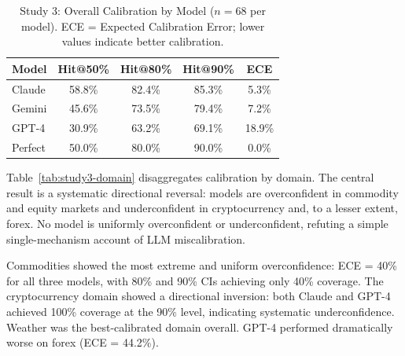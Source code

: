 \begin{table}[ht]
  \centering
  \caption{Study 3: Overall Calibration by Model ($n = 68$ per model).
    ECE = Expected Calibration Error; lower values indicate better calibration.}
  \label{tab:study3-overall}
  \begin{tabular}{lcccc}
    \toprule
    Model   & Hit@50\% & Hit@80\% & Hit@90\% & ECE    \\
    \midrule
    Claude  & 58.8\%   & 82.4\%   & 85.3\%   & 5.3\%  \\
    Gemini  & 45.6\%   & 73.5\%   & 79.4\%   & 7.2\%  \\
    GPT-4   & 30.9\%   & 63.2\%   & 69.1\%   & 18.9\% \\
    \midrule
    Perfect & 50.0\%   & 80.0\%   & 90.0\%   & 0.0\%  \\
    \bottomrule
  \end{tabular}
\end{table}

Table~\ref{tab:study3-domain} disaggregates calibration by domain. The central result
is a systematic directional reversal: models are overconfident in commodity and equity
markets and underconfident in cryptocurrency and, to a lesser extent, forex. No model
is uniformly overconfident or underconfident, refuting a simple single-mechanism
account of LLM miscalibration.

Commodities showed the most extreme and uniform overconfidence: ECE = 40\% for all
three models, with 80\% and 90\% CIs achieving only 40\% coverage. The cryptocurrency
domain showed a directional inversion: both Claude and GPT-4 achieved 100\% coverage
at the 90\% level, indicating systematic underconfidence. Weather was the
best-calibrated domain overall. GPT-4 performed dramatically worse on forex
(ECE = 44.2\%).


